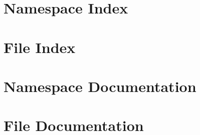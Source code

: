 \documentclass[twoside]{book}
\newcommand{\+}{\discretionary{\mbox{\scriptsize$\hookleftarrow$}}{}{}}
\begin{document}
\chapter{Namespace Index}

\chapter{File Index}

\chapter{Namespace Documentation}

\chapter{File Documentation}






























































\end{document}
